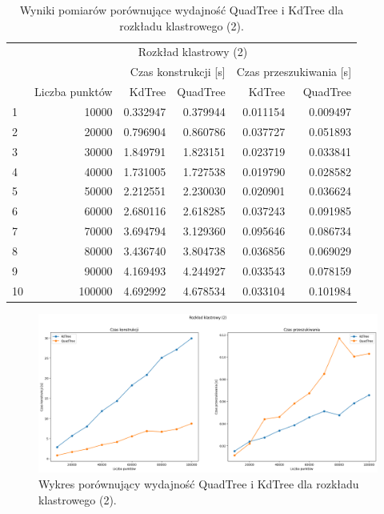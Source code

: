 \documentclass{lab}
\begin{document}
\begin{table}[H]
\centering
\begin{tabular}{lrrrrr}
  \toprule
   & \multicolumn{5}{c}{Rozkład klastrowy (2)} \\
   &  & \multicolumn{2}{r}{Czas konstrukcji [s]} & \multicolumn{2}{r}{Czas przeszukiwania [s]} \\
   & Liczba punktów & KdTree & QuadTree & KdTree & QuadTree \\
  \midrule
1 & 10000 & 0.332947 & 0.379944 & 0.011154 & 0.009497 \\
2 & 20000 & 0.796904 & 0.860786 & 0.037727 & 0.051893 \\
3 & 30000 & 1.849791 & 1.823151 & 0.023719 & 0.033841 \\
4 & 40000 & 1.731005 & 1.727538 & 0.019790 & 0.028582 \\
5 & 50000 & 2.212551 & 2.230030 & 0.020901 & 0.036624 \\
6 & 60000 & 2.680116 & 2.618285 & 0.037243 & 0.091985 \\
7 & 70000 & 3.694794 & 3.129360 & 0.095646 & 0.086734 \\
8 & 80000 & 3.436740 & 3.804738 & 0.036856 & 0.069029 \\
9 & 90000 & 4.169493 & 4.244927 & 0.033543 & 0.078159 \\
10 & 100000 & 4.692992 & 4.678534 & 0.033104 & 0.101984 \\
  \bottomrule
  \end{tabular}
\caption{Wyniki pomiarów porównujące wydajność QuadTree i KdTree dla rozkładu klastrowego (2).}
\label{tab:cluster_time_2}
\end{table}

\begin{figure}[H]
  \centering
  \includegraphics[width=1\textwidth]{resources/cluster_graph_2.png}
  \caption{Wykres porównujący wydajność QuadTree i KdTree dla rozkładu klastrowego (2).}
  \label{fig:cluster_graph_2}
\end{figure}
\end{document}
